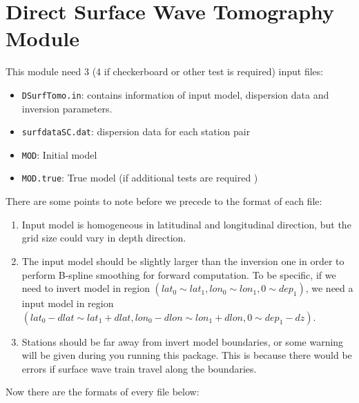 \documentclass[UTF8]{article}
\begin{document}
     \section{Direct Surface Wave Tomography Module}
     This module need 3 (4 if checkerboard or other test is required) input files:
     \begin{itemize}
        \item \verb!DSurfTomo.in!: contains information of input model, dispersion data and inversion parameters.
        \item \verb!surfdataSC.dat!: dispersion data for each station pair
        \item \verb!MOD!: Initial model
        \item \verb!MOD.true!: True model (if additional tests are required )
    \end{itemize}
    There are some points to note before we precede to the format of each file:
    \begin{enumerate}[(1)]
         \item Input model is homogeneous in latitudinal and longitudinal direction, but 
                the grid size could vary in depth direction.
        \item The input model should be slightly larger than the inversion one in order to 
              perform B-spline smoothing for forward computation. To be specific,
              if we need to invert model in region $(lat_0 \sim lat_1,lon_0\sim lon_1,0\sim dep_1)$, 
              we need a input model in region $(lat_0-dlat \sim lat_1+dlat, lon_0-dlon \sim lon_1+dlon,0 \sim dep_1-dz)$.
         \item Stations should be far away from invert model boundaries, or some warning will be given during 
                you running this package. This is because there would be errors if surface wave train travel 
                along the boundaries.
    \end{enumerate}
    Now there are the formats of every file below:
\end{document}
